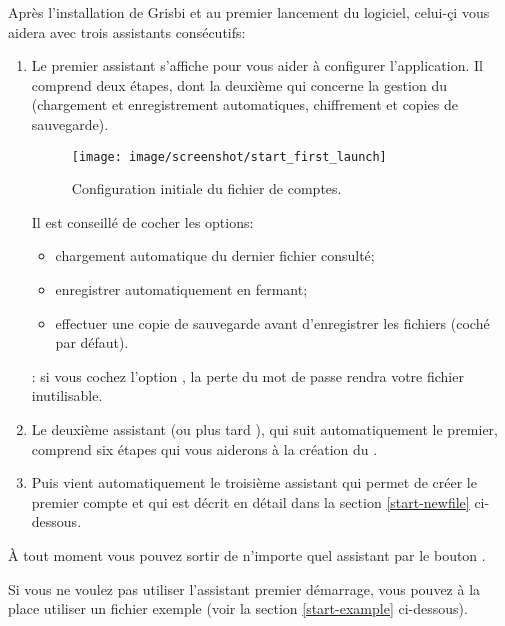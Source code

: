 Après l'installation de Grisbi et au premier lancement du logiciel, celui-çi vous aidera avec trois assistants consécutifs:
\begin{enumerate}
	\item Le premier assistant  s'affiche pour vous aider à configurer l'application. Il comprend deux étapes, dont la deuxième qui concerne la gestion du  (chargement et enregistrement automatiques, chiffrement et copies de sauvegarde).

\begin{figure}[htbp]
	\begin{center}
		\texttt{[image: image/screenshot/start\_first\_launch]}
	\end{center}
	\caption{Configuration initiale du fichier de comptes.}
	\label{start_first_launch}
\end{figure}

Il est conseillé de cocher les options:

\begin{itemize}
 \item chargement automatique du dernier fichier consulté;
 \item enregistrer automatiquement en fermant;
 \item effectuer une copie de sauvegarde avant d'enregistrer les fichiers (coché par défaut).
\end{itemize}

\textcolor{red}{}: si vous cochez l'option , la perte du mot de passe rendra votre fichier inutilisable.

	\item Le deuxième assistant  (ou plus tard ), qui suit automatiquement le premier, comprend six étapes qui vous aiderons à la création du . 
	\item Puis vient automatiquement le troisième assistant  qui permet de créer le premier compte et qui est décrit en détail dans la section \ref{start-newfile} ci-dessous.
\end{enumerate}
À tout moment vous pouvez sortir de n'importe quel assistant par le bouton .

Si vous ne voulez pas utiliser l'assistant premier démarrage, vous pouvez à la
place utiliser un fichier exemple (voir la section \ref{start-example} ci-dessous).


